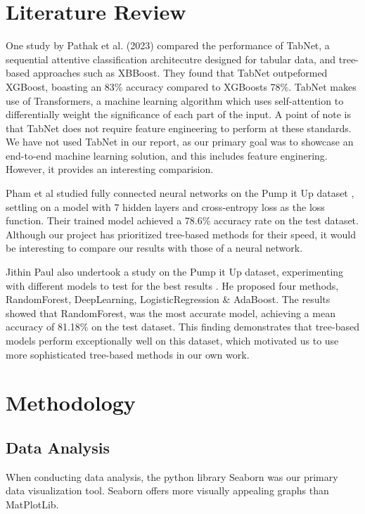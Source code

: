 \documentclass[conference]{IEEEtran}
\begin{document}
\section{Literature Review}

One study by Pathak et al. (2023) \cite{pathak2023pump} compared the performance of TabNet, a sequential attentive classification architecutre designed for tabular data, and tree-based approaches such as XBBoost. They found that TabNet outpeformed XGBoost, boasting an 83\% accuracy compared to XGBoosts 78\%. TabNet makes use of Transformers, a machine learning algorithm which uses self-attention to differentially weight the significance of each part of the input. A point of note is that TabNet does not require feature engineering to perform at these standards. We have not used TabNet in our report, as our primary goal was to showcase an end-to-end machine learning solution, and this includes feature enginering. However, it provides an interesting comparision.

Pham et al studied fully connected neural networks on the Pump it Up dataset \cite{Pham_2018}, settling on a model with 7 hidden layers and cross-entropy loss as the loss function. Their trained model achieved a 78.6\% accuracy rate on the test dataset. Although our project has prioritized tree-based methods for their speed, it would be interesting to compare our results with those of a neural network.

Jithin Paul also undertook a study on the Pump it Up dataset, experimenting with different models to test for the best results \cite{Paul_2023}. He proposed four methods, RandomForest, DeepLearning, LogisticRegression \& AdaBoost. The results showed that RandomForest, was the most accurate model, achieving a mean accuracy of 81.18\% on the test dataset. This finding demonstrates that tree-based models perform exceptionally well on this dataset, which motivated us to use more sophisticated tree-based methods in our own work.

\section{Methodology}

\subsection{Data Analysis}


When conducting data analysis, the python library Seaborn \cite{seaborn} was our primary data visualization tool. Seaborn offers more visually appealing graphs than MatPlotLib.
\end{document}
